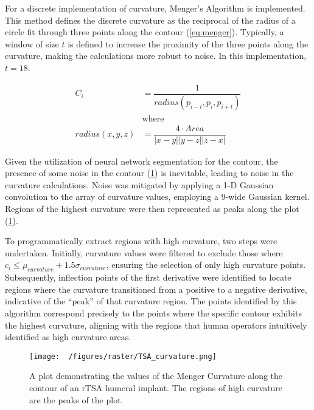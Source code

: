 For a discrete implementation of curvature, Menger's Algorithm \cite{legerMengerCurvatureRectifiability1999} is implemented.
This method defines the discrete curvature as the reciprocal of the radius of a circle fit through three points along the contour (\cref{eq:menger}).
Typically, a window of size $t$ is defined to increase the proximity of the three points along the curvature, making the calculations more robust to noise.
In this implementation, $t=18$.


\begin{equation}
  \label{eq:menger}
  \begin{split}
  C_{i} &= \dfrac{1}{radius(p_{i-t},p_{i},p_{i+t})}\\
        &\text{where} \\
        radius(x,y,z) &= \dfrac{4 \cdot Area}{|x-y||y-z||z-x|}
  \end{split}
\end{equation}

Given the utilization of neural network segmentation for the contour, the presence of some noise in the contour (\cref{fig:tsa-curv}) is inevitable, leading to noise in the curvature calculations.
Noise was mitigated by applying a 1-D Gaussian convolution to the array of curvature values, employing a 9-wide Gaussian kernel.
Regions of the highest curvature were then represented as peaks along the plot (\cref{fig:tsa-curv}).

To programmatically extract regions with high curvature, two steps were undertaken.
Initially, curvature values were filtered to exclude those where $c_{i} \le \mu_{curvature} + 1.5\sigma_{curvature}$, ensuring the selection of only high curvature points.
Subsequently, inflection points of the first derivative were identified to locate regions where the curvature transitioned from a positive to a negative derivative, indicative of the ``peak'' of that curvature region.
The points identified by this algorithm correspond precisely to the points where the specific contour exhibits the highest curvature, aligning with the regions that human operators intuitively identified as high curvature areas.


\begin{figure}[h!]
  \centering
  \texttt{[image: ~/figures/raster/TSA\_curvature.png]}
  \caption{A plot demonstrating the values of the Menger Curvature along the contour of an rTSA humeral implant. The regions of high curvature are the peaks of the plot.}
  \label{fig:tsa-curv}
\end{figure}



